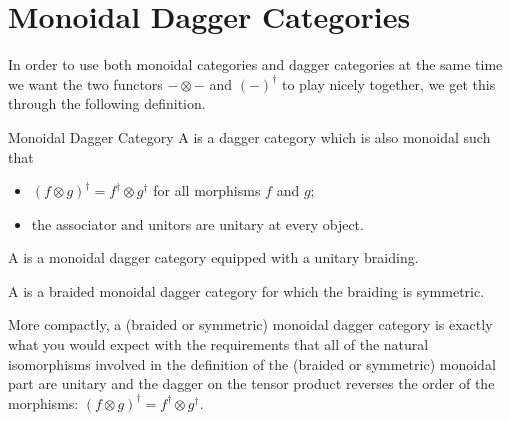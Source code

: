 \documentclass[fleqn]{NotesClass}
\begin{document}
    \section{Monoidal Dagger Categories}
    In order to use both monoidal categories and dagger categories at the same time we want the two functors \(-\otimes-\) and \((-)^\dagger\) to play nicely together, we get this through the following definition.
    \begin{dfn}{Monoidal Dagger Category}{}
        A  is a dagger category which is also monoidal such that
        \begin{itemize}
            \item \((f \otimes g)^\dagger = f^\dagger \otimes g^\dagger\) for all morphisms \(f\) and \(g\);
            \item the associator and unitors are unitary at every object.
        \end{itemize}
    
        A  is a monoidal dagger category equipped with a unitary braiding.
        
        A  is a braided monoidal dagger category for which the braiding is symmetric.
    \end{dfn}
    
    More compactly, a (braided or symmetric) monoidal dagger category is exactly what you would expect with the requirements that all of the natural isomorphisms involved in the definition of the (braided or symmetric) monoidal part are unitary and the dagger on the tensor product reverses the order of the morphisms: \((f\otimes g)^\dagger = f^\dagger \otimes g^\dagger\).
    
\end{document}
